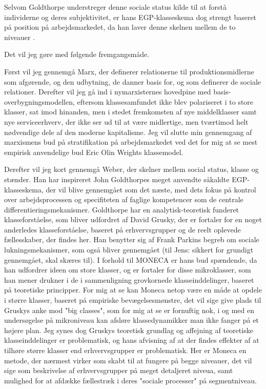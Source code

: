 Selvom Goldthorpe understreger denne sociale status kilde til at forstå individerne og deres subjektivitet, er hans EGP-klasseskema dog strengt baseret på position på arbejdsmarkedet, da han laver denne skelnen mellem de to niveauer \parencite[95]{Harrits2014}. 








 









Det vil jeg gøre med følgende fremgangsmåde. 

Først vil jeg gennemgå Marx, der definerer relationerne til produktionsmidlerne som afgørende, og den udbytning, de danner basis for, og som definerer de sociale relationer. Derefter vil jeg gå ind i nymarxisternes hovedpine med basis-overbygningsmodellen, eftersom klassesamfundet ikke blev polariseret i to store klasser, sat imod hinanden, men i stedet fremkomsten af nye middelklasser samt nye serviceerhverv, der ikke ser ud til at være midlertige, men tværtimod helt nødvendige dele af den moderne kapitalisme. Jeg vil slutte min gennemgang af marxismens bud på stratifikation på arbejdsmarkedet ved det for mig at se mest empirisk anvendelige bud Eric Olin Wrights klassemodel.

Derefter vil jeg kort gennemgå Weber, der skelner mellem social status, klasse og stænder. Han har inspireret John Goldthorpes meget anvendte såkaldte EGP-klasseskema, der vil blive gennemgået som det næste, med dets fokus på kontrol over arbejdsprocessen og specifiteten af faglige kompetencer som de centrale differentieringsmekanismer. Goldthorpe har en analytisk-teoretisk funderet klasseforståelse, som bliver udfordret af David Grusky, der er fortaler for en noget anderledes klasseforståelse, baseret på erhvervsgrupper og de reelt oplevede fællesskaber, der findes her. Han benytter sig af Frank Parkins begreb om sociale lukningsmekanismer, som også bliver gennemgået (til Jens: sikkert for grundigt gennemgået, skal skæres til). I forhold til MONECA er hans bud spændende, da han udfordrer ideen om store klasser, og er fortaler for disse mikroklasser, som han mener drukner i de i sammenligning grovkornede klasseinddelinger, baseret på teoretiske principper. For mig at se kan Moneca netop være en måde at opdele i større klasser, baseret på empiriske bevægelsesmønstre, det vil sige give plads til Gruskys anke mod "big classes", som for mig at se er fornuftig nok, i og med en undersøgelse på mikroniveau kan afsløre klassedynamikker man ikke fanger på et højere plan. Jeg synes dog Gruskys teoretisk grundlag og affejning af teoretiske klasseinddelinger er problematisk, og hans afvisning af at der findes effekter af at tilhøre større klasser end erhvervsgrupper er problematisk. Her er Moneca en metode, der nærmest virker som skabt til at fungere på begge niveauer, det vil sige som beskrivelse af erhvervsgrupper på meget detaljeret niveua, samt mulighed for at afdække fællestræk i deres "sociale processer" på segmentniveau.

